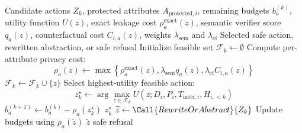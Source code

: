 \begin{algorithm}[t]
\caption{Privacy-Budgeted Runtime Selection}
\label{alg:privacy-budgeted-runtime-selection}
\begin{algorithmic}[1]
\Require Candidate actions $Z_k$, protected attributes $A_{\mathrm{protected},i}$, remaining budgets $b_a^{(k)}$, utility function $U(z)$, exact leakage cost $\rho^{\mathrm{exact}}_a(z)$, semantic verifier score $q_a(z)$, counterfactual cost $C_{i,a}(z)$, weights $\lambda_{\mathrm{sem}}$ and $\lambda_{\mathrm{cf}}$
\Ensure Selected safe action, rewritten abstraction, or safe refusal
\State Initialize feasible set $\mathcal{F}_k \gets \emptyset$
        \State Compute per-attribute privacy cost:
        \[
        \rho_a(z)
        \gets
        \max
        \left\{
        \rho^{\mathrm{exact}}_a(z),
        \lambda_{\mathrm{sem}} q_a(z),
        \lambda_{\mathrm{cf}} C_{i,a}(z)
        \right\}
        \]
    \EndFor
        \State $\mathcal{F}_k \gets \mathcal{F}_k \cup \{z\}$
    \EndIf
\EndFor
{}
    \State Select highest-utility feasible action:
    \[
    z_k^\star
    \gets
    \arg\max_{z \in \mathcal{F}_k}
    U(z; D_i, P_i, T_{\mathrm{instr},i}, H_{i,<k})
    \]
        \State $b_a^{(k+1)} \gets b_a^{(k)} - \rho_a(z_k^\star)$
    \EndFor
    \State \Return $z_k^\star$
\Else
    \State $\widetilde{z} \gets \Call{RewriteOrAbstract}{Z_k}$
        \State Update budgets using $\rho_a(\widetilde{z})$
        \State \Return $\widetilde{z}$
    \Else
        \State \Return safe refusal
    \EndIf
\EndIf
\end{algorithmic}
\end{algorithm}
